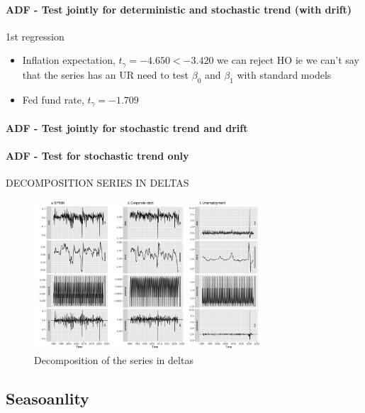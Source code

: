 \documentclass[hidelinks,12pts]{article}
\DeclareMathOperator{\1}{\mathbbm{1}}
\begin{document}
\paragraph*{ADF - Test jointly for deterministic and stochastic trend (with drift)}

1st regression
\begin{itemize}
    \item  Inflation expectation, $t_\gamma = -4.650 < -3.420$ we can reject HO ie we can't say that the series has an UR 
    \subitem need to test $\beta_0 $ and $\beta_1$ with standard models 
    \item Fed fund rate, $t_\gamma = -1.709$
\end{itemize}


%


\paragraph*{ADF - Test jointly for stochastic trend and drift}


\paragraph*{ADF - Test for stochastic trend only}


DECOMPOSITION SERIES IN DELTAS 

\begin{figure}[h!]
    \centering
    \includegraphics[width = 0.75\textwidth]{IMAGES/decomposition_iii_deltas.png}
    \caption{Decomposition of the series in deltas}
\end{figure}

    \subsection{Seasoanlity}
\end{document}
